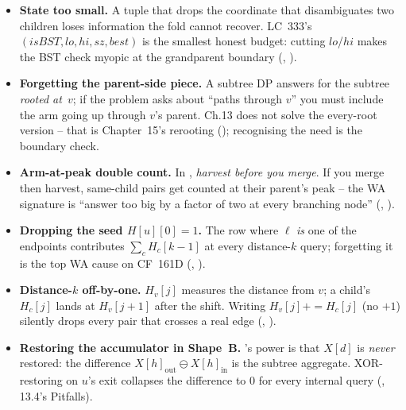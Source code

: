 \begin{itemize}[nosep, leftmargin=1.4em]
  \item \textbf{State too small.} A tuple that drops the coordinate that
        disambiguates two children loses information the fold cannot
        recover. LC~333's $(\mathit{isBST},\mathit{lo},\mathit{hi},
        \mathit{sz},\mathit{best})$ is the smallest honest budget: cutting
        $\mathit{lo}$/$\mathit{hi}$ makes the BST check myopic at the
        grandparent boundary (,
        ).
  \item \textbf{Forgetting the parent-side piece.} A subtree DP answers
        for the subtree \emph{rooted at}~$v$; if the problem asks about
        ``paths through $v$'' you must include the arm going up through
        $v$'s parent. Ch.13 does not solve the every-root version --
        that is Chapter~15's rerooting (); recognising the
        need is the boundary check.
  \item \textbf{Arm-at-peak double count.} In ,
        \emph{harvest before you merge}. If you merge then harvest,
        same-child pairs get counted at their parent's peak -- the WA
        signature is ``answer too big by a factor of two at every
        branching node'' (,
        ).
  \item \textbf{Dropping the seed $\mathit{H}[u][0]=1$.} The row where
        $\ell$ \emph{is} one of the endpoints contributes $\sum_c
        \mathit{H}_c[k-1]$ at every distance-$k$ query; forgetting it is
        the top WA cause on CF~161D (,
        ).
  \item \textbf{Distance-$k$ off-by-one.} $\mathit{H}_v[j]$ measures the
        distance from $v$; a child's $\mathit{H}_c[j]$ lands at
        $\mathit{H}_v[j+1]$ after the shift. Writing
        $\mathit{H}_v[j] += \mathit{H}_c[j]$ (no $+1$) silently drops
        every pair that crosses a real edge (,
        ).
  \item \textbf{Restoring the accumulator in Shape~B.}
        's power is that $\mathit{X}[d]$ is
        \emph{never} restored: the difference
        $\mathit{X}[h]_{\mathrm{out}}\ominus\mathit{X}[h]_{\mathrm{in}}$
        is the subtree aggregate. XOR-restoring on $u$'s exit collapses
        the difference to $0$ for every internal query
        (, 13.4's Pitfalls).

\end{itemize}
